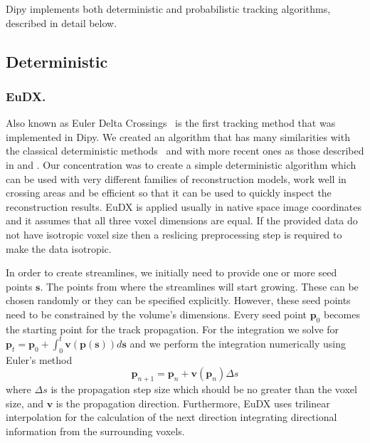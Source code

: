 \documentclass{bioinfo}
\begin{document}
Dipy implements both deterministic and probabilistic tracking algorithms,
described in detail below.

\subsection{Deterministic}

\subsubsection{EuDX.}
Also known as Euler Delta Crossings~\citep{Garyfallidis_thesis} is the first tracking
method that was implemented in Dipy. We created an algorithm that has many
similarities with the classical deterministic methods~\citep{Mori1999,
  conturo-lori-etal:99, basser-pajevic-etal:00} and with more recent ones as
those described in \citet{descoteaux-deriche-etal:09} and
\citet{yeh-etal:10}. Our concentration was to create a simple
deterministic algorithm which can be used with very different families of
reconstruction models, work well in crossing areas and be efficient so that it
can be used to quickly inspect the reconstruction results. EuDX is applied
usually in native space image coordinates and it assumes that all three voxel
dimensions are equal. If the provided data do not have
isotropic voxel size then a reslicing preprocessing step is
required to make the data isotropic.

In order to create streamlines, we initially need to provide one or more seed
points $\mathbf{s}$. The points from where the streamlines will start growing. These can
be chosen randomly or they can be specified explicitly. However, these seed
points need to be constrained by the volume's dimensions. Every seed point
$\mathbf{p}_{0}$ becomes the starting point for the track propagation. For the
integration we solve for
$\mathbf{p}_{t}=\mathbf{p}_{0}+\int_{0}^{t}\mathbf{v}(\mathbf{p}(\mathbf{s}))d\mathbf{s}$
and we perform the integration numerically using Euler's method
\begin{equation}
\mathbf{p}_{n+1}=\mathbf{p}_{n}+\mathbf{v}(\mathbf{p}_{n})\Delta s\label{eq:euler}
\end{equation}
\noindent where $\Delta s$ is the propagation step size which should be no
greater than the voxel size, and $\mathbf{v}$ is the propagation
direction. Furthermore, EuDX uses trilinear interpolation for the calculation
of the next direction integrating directional information from the surrounding
voxels.
\end{document}
